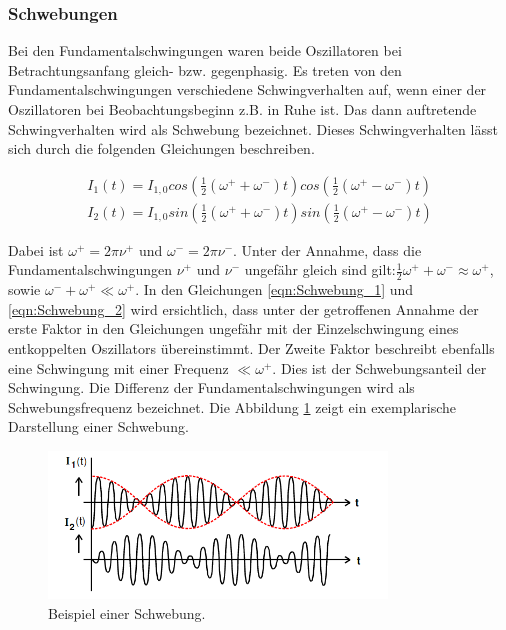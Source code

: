 \subsubsection{Schwebungen}

Bei den Fundamentalschwingungen waren beide Oszillatoren bei Betrachtungsanfang
gleich- bzw. gegenphasig. Es treten von den Fundamentalschwingungen
verschiedene Schwingverhalten auf, wenn einer der Oszillatoren bei
Beobachtungsbeginn z.B. in Ruhe ist.
Das dann auftretende Schwingverhalten wird als Schwebung bezeichnet.
Dieses Schwingverhalten lässt sich durch die folgenden Gleichungen beschreiben.

\begin{align}
  \label{eqn:Schwebung_1}
  I_1(t) = I_{1,0}cos\left(\frac{1}{2}\left(\omega^+ + \omega^-\right)t\right)cos\left(\frac{1}{2}\left(\omega^+-\omega^-\right)t\right)\\
  \label{eqn:Schwebung_2}
  I_2(t) = I_{1,0}sin\left(\frac{1}{2}\left(\omega^+ + \omega^-\right)t\right)sin\left(\frac{1}{2}\left(\omega^+-\omega^-\right)t\right)
\end{align}

Dabei ist $\omega^+ = 2\pi\nu^+$ und $\omega^- = 2\pi\nu^-$.
Unter der Annahme, dass die Fundamentalschwingungen $\nu^+$ und $\nu^-$ ungefähr
gleich sind gilt:$\frac{1}{2}\omega^++\omega^-\approx\omega^+$, sowie
$\omega^- + \omega^+ \ll\omega^+$.
In den Gleichungen \eqref{eqn:Schwebung_1} und \eqref{eqn:Schwebung_2} wird
ersichtlich, dass unter der getroffenen Annahme der erste Faktor in den Gleichungen
ungefähr mit der Einzelschwingung eines entkoppelten Oszillators übereinstimmt.
Der Zweite Faktor beschreibt ebenfalls eine Schwingung mit einer Frequenz
$\ll\omega^+$. Dies ist der Schwebungsanteil der Schwingung.
Die Differenz der Fundamentalschwingungen wird als Schwebungsfrequenz
bezeichnet. Die Abbildung \ref{fig:Schwebung} zeigt ein exemplarische Darstellung
einer Schwebung.

\begin{figure}
  \centering
  \includegraphics[width=9cm]{V355_Schwebung.png}
  \caption{Beispiel einer Schwebung.\cite{anleitung01}\protect}
  \label{fig:Schwebung}
\end{figure}


